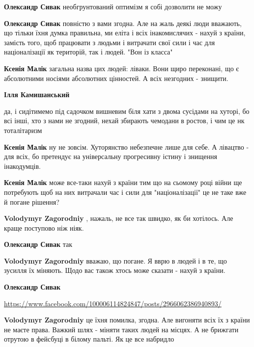 \begin{itemize}
\begin{itemize}
\textbf{Олександр Сивак} необгрунтований оптимізм я собі дозволити не можу

\textbf{Олександр Сивак} повністю з вами згодна. Але на жаль деякі люди вважають, що тільки їхня думка правильна, ми еліта і всіх інакомислячих - нахуй з країни, замість того, щоб працювати з людьми і витрачати свої сили і час для націоналізації як територій, так і людей. "Вон із класса"

\textbf{Ксенія Малік} загальна назва цих людей: ліваки.
Вони щиро переконані, що є абсолютними носіями абсолютних цінностей. А всіх незгодних - знищити.

\textbf{Ілля Камишанський} 

да, і сидітимемо під садочком вишневим біля хати з двома сусідами на хуторі, бо
всі інші, хто з нами не згодний, нехай збирають чемодани в ростов, і чим це нк
тоталітаризм


\textbf{Ксенія Малік} ну не зовсім. Хуторянство небезпечне лише для себе.
А лівацтво - для всіх, бо претендує на універсальну прогресивну істину і знищення інакодумців.

\textbf{Ксенія Малік} може все-таки нахуй з країни тим що на сьомому році війни ще потребують щоб на них витрачали час і сили для "націоналізації" це не таке вже й погане рішення?


\textbf{Volodymyr Zagorodniy} , нажаль, не все так швидко, як би хотілось. Але краще поступово ніж ніяк.

\textbf{Олександр Сивак} так

\textbf{Volodymyr Zagorodniy} вважаю, що погане. Я вврю в людей і в те, що зусилля їх міняють. Щодо вас також хтось може сказати - нахуй з країни.

\textbf{Олександр Сивак} 

\url{https://www.facebook.com/100006114824847/posts/2966062386940893/}

\textbf{Volodymyr Zagorodniy} це їхня помилка, згодна. Але вигоняти всіх їх з країни не маєте права. Важкий шлях - міняти таких людей на місцях. А не брижгати отрутою в фейсбуці в білому пальті. Як це все набридло


\end{itemize}
\end{itemize}
